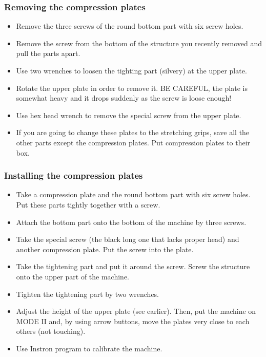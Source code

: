 \documentclass[a4paper]{article}
\begin{document}
\subsubsection{Removing the compression plates}

\begin{itemize}
  \item Remove the three screws of the round bottom part with six screw holes.
  \item Remove the screw from the bottom of the structure you recently removed and pull the parts apart.
  \item Use two wrenches to loosen the tighting part (silvery) at the upper plate.
  \item Rotate the upper plate in order to remove it. BE CAREFUL, the plate is somewhat heavy and it drops suddenly as the screw is loose enough!
  \item Use hex head wrench to remove the special screw from the upper plate.
  \item If you are going to change these plates to the stretching grips, save all the other parts except the compression plates. Put compression plates to their box.
\end{itemize}

\subsubsection{Installing the compression plates}

\begin{itemize}
  \item Take a compression plate and the round bottom part with six screw holes. Put these parts tightly together with a screw.
  \item Attach the bottom part onto the bottom of the machine by three screws.
  \item Take the special screw (the black long one that lacks proper head) and another compression plate. Put the screw into the plate.
  \item Take the tightening part and put it around the screw. Screw the structure onto the upper part of the machine.
  \item Tighten the tightening part by two wrenches.
  \item Adjust the height of the upper plate (see earlier). Then, put the machine on \textsf{MODE II} and, by using arrow buttons, move the plates very close to each others (not touching).
  \item Use Instron program to calibrate the machine.
\end{itemize}
\end{document}
